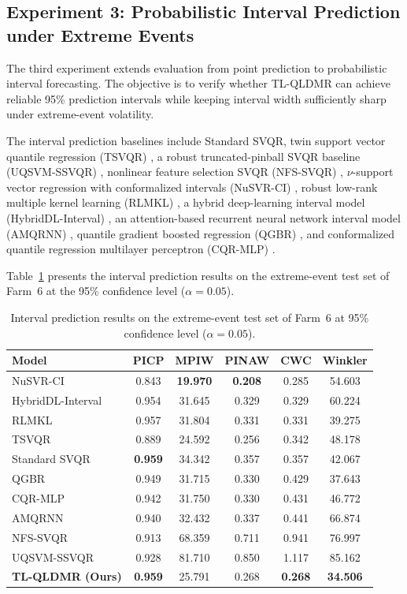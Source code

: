 \documentclass[a4paper]{cas-sc}
\begin{document}
\subsection{Experiment 3: Probabilistic Interval Prediction under Extreme Events}\label{sec:exp3}

The third experiment extends evaluation from point prediction to probabilistic interval forecasting. The objective is to verify whether TL-QLDMR can achieve reliable 95\% prediction intervals while keeping interval width sufficiently sharp under extreme-event volatility.

The interval prediction baselines include Standard SVQR, twin support vector quantile regression (TSVQR) \citep{tsvqr2023}, a robust truncated-pinball SVQR baseline (UQSVM-SSVQR) \citep{wang2024ssvqr}, nonlinear feature selection SVQR (NFS-SVQR) \citep{ye2025nfs}, $\nu$-support vector regression with conformalized intervals (NuSVR-CI) \citep{romano2019cqr}, robust low-rank multiple kernel learning (RLMKL) \citep{jiang2021rlmkl}, a hybrid deep-learning interval model (HybridDL-Interval) \citep{hybriddl2025}, an attention-based recurrent neural network interval model (AMQRNN) \citep{amqrnn2025}, quantile gradient boosted regression (QGBR) \citep{hu2025ncqgbr}, and conformalized quantile regression multilayer perceptron (CQR-MLP) \citep{hu2025nescqr}.

Table~\ref{tab:exp3_results} presents the interval prediction results on the extreme-event test set of Farm~6 at the 95\% confidence level ($\alpha = 0.05$).

\begin{table}[ht]
\centering
\caption{Interval prediction results on the extreme-event test set of Farm~6 at 95\% confidence level ($\alpha = 0.05$).}
\setlength{\tabcolsep}{4mm}
\begin{tabular}{lccccc}
\toprule
Model & PICP & MPIW & PINAW & CWC & Winkler \\
\midrule
NuSVR-CI            & 0.843 & \textbf{19.970} & \textbf{0.208} & 0.285 & 54.603 \\
HybridDL-Interval   & 0.954 & 31.645 & 0.329 & 0.329 & 60.224 \\
RLMKL               & 0.957 & 31.804 & 0.331 & 0.331 & 39.275 \\
TSVQR               & 0.889 & 24.592 & 0.256 & 0.342 & 48.178 \\
Standard SVQR       & \textbf{0.959} & 34.342 & 0.357 & 0.357 & 42.067 \\
QGBR                & 0.949 & 31.715 & 0.330 & 0.429 & 37.643 \\
CQR-MLP             & 0.942 & 31.750 & 0.330 & 0.431 & 46.772 \\
AMQRNN              & 0.940 & 32.432 & 0.337 & 0.441 & 66.874 \\
NFS-SVQR            & 0.913 & 68.359 & 0.711 & 0.941 & 76.997 \\
UQSVM-SSVQR         & 0.928 & 81.710 & 0.850 & 1.117 & 85.162 \\
\textbf{TL-QLDMR (Ours)} & \textbf{0.959} & 25.791 & 0.268 & \textbf{0.268} & \textbf{34.506} \\
\bottomrule
\end{tabular}
\label{tab:exp3_results}
\end{table}
\end{document}
